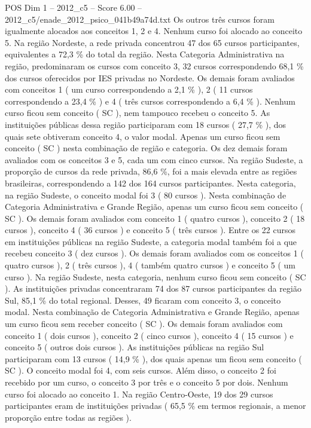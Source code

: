 \begin{textsample}{POS Dim 1 – 2012\_c5 – Score 6.00 – 2012\_c5/enade\_2012\_psico\_041b49a74d.txt}
Os outros três cursos foram igualmente alocados aos conceitos 1, 2 e 4.
Nenhum curso foi alocado ao conceito 5.
Na região Nordeste, a rede privada concentrou 47 dos 65 cursos participantes, equivalentes a 72,3 \% do total da região.
Nesta Categoria Administrativa na região, predominaram os cursos com conceito 3, 32 cursos correspondendo 68,1 \% dos cursos oferecidos por IES privadas no Nordeste.
Os demais foram avaliados com conceitos 1 ( um curso correspondendo a 2,1 \% ), 2 ( 11 cursos correspondendo a 23,4 \% ) e 4 ( três cursos correspondendo a 6,4 \% ).
Nenhum curso ficou sem conceito ( SC ), nem tampouco recebeu o conceito 5.
As instituições públicas dessa região participaram com 18 cursos ( 27,7 \% ), dos quais sete obtiveram conceito 4, o valor modal.
Apenas um curso ficou sem conceito ( SC ) nesta combinação de região e categoria.
Os dez demais foram avaliados com os conceitos 3 e 5, cada um com cinco cursos.
Na região Sudeste, a proporção de cursos da rede privada, 86,6 \%, foi a mais elevada entre as regiões brasileiras, correspondendo a 142 dos 164 cursos participantes.
Nesta categoria, na região Sudeste, o conceito modal foi 3 ( 80 cursos ).
Nesta combinação de Categoria Administrativa e Grande Região, apenas um curso ficou sem conceito ( SC ).
Os demais foram avaliados com conceito 1 ( quatro cursos ), conceito 2 ( 18 cursos ), conceito 4 ( 36 cursos ) e conceito 5 ( três cursos ).
Entre os 22 cursos em instituições públicas na região Sudeste, a categoria modal também foi a que recebeu conceito 3 ( dez cursos ).
Os demais foram avaliados com os conceitos 1 ( quatro cursos ), 2 ( três cursos ), 4 ( também quatro cursos ) e conceito 5 ( um curso ).
Na região Sudeste, nesta categoria, nenhum curso ficou sem conceito ( SC ).
As instituições privadas concentraram 74 dos 87 cursos participantes da região Sul, 85,1 \% do total regional.
Desses, 49 ficaram com conceito 3, o conceito modal.
Nesta combinação de Categoria Administrativa e Grande Região, apenas um curso ficou sem receber conceito ( SC ).
Os demais foram avaliados com conceito 1 ( dois cursos ), conceito 2 ( cinco cursos ), conceito 4 ( 15 cursos ) e conceito 5 ( outros dois cursos ).
As instituições públicas na região Sul participaram com 13 cursos ( 14,9 \% ), dos quais apenas um ficou sem conceito ( SC ).
O conceito modal foi 4, com seis cursos.
Além disso, o conceito 2 foi recebido por um curso, o conceito 3 por três e o conceito 5 por dois.
Nenhum curso foi alocado ao conceito 1.
Na região Centro-Oeste, 19 dos 29 cursos participantes eram de instituições privadas ( 65,5 \% em termos regionais, a menor proporção entre todas as regiões ).

\end{textsample}
